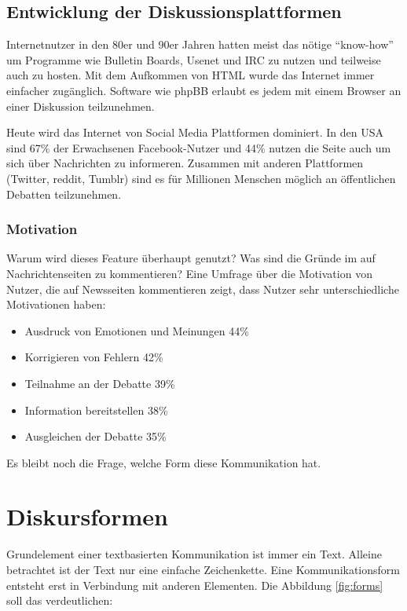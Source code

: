 \documentclass[nobib, nohyper, a4paper,openany]{tufte-book}
\begin{document}
\section{Entwicklung der Diskussionsplattformen}
Internetnutzer in den 80er und 90er Jahren hatten meist das nötige ``know-how'' 
um Programme wie Bulletin Boards, Usenet und IRC zu nutzen und teilweise auch zu hosten.
Mit dem Aufkommen von HTML wurde das Internet immer einfacher zugänglich.
Software wie phpBB\cite{phpBB2017} erlaubt es jedem mit einem Browser an einer Diskussion teilzunehmen. 

Heute wird das Internet von Social Media Plattformen dominiert.
In den USA sind 67\% der Erwachsenen Facebook-Nutzer und 44\% nutzen die Seite auch um sich über Nachrichten
zu informeren\cite{GottfriedNewsUseSocial2016}. 
Zusammen mit anderen Plattformen (Twitter, reddit, Tumblr)
sind es für Millionen Menschen möglich an öffentlichen Debatten teilzunehmen.

\subsection{Motivation}
Warum wird dieses Feature überhaupt genutzt? 
Was sind die Gründe im auf Nachrichtenseiten zu kommentieren? 
Eine Umfrage über die Motivation von Nutzer, die auf Newsseiten kommentieren\cite{StroudCommentSectionSurvey} zeigt, dass Nutzer sehr unterschiedliche Motivationen haben: 
\begin{itemize}
  \item Ausdruck von Emotionen und Meinungen  44\%
  \item Korrigieren von Fehlern 42\%
  \item Teilnahme an der Debatte 39\%
  \item Information bereitstellen 38\%
  \item Ausgleichen der Debatte 35\%
\end{itemize}

Es bleibt noch die Frage, welche Form diese Kommunikation hat.

\chapter{Diskursformen} 
Grundelement einer textbasierten Kommunikation ist immer ein Text. 
Alleine betrachtet ist der Text nur eine einfache Zeichenkette. 
Eine Kommunikationsform entsteht erst in Verbindung mit anderen Elementen.
Die Abbildung \ref{fig:forms} soll das verdeutlichen:
\end{document}
